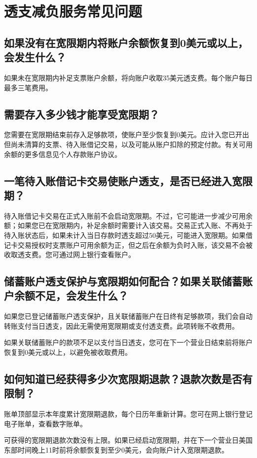 \documentclass[UTF8,fontset=none,11pt,a4paper]{ctexart}
\begin{document}
\section*{透支减负服务常见问题}
\subsection*{如果没有在宽限期内将账户余额恢复到0美元或以上，会发生什么？}
如果未在宽限期内补足支票账户余额，将向账户收取35美元透支费。每个账户每日最多三笔费用。


\subsection*{需要存入多少钱才能享受宽限期？}
您需要在宽限期结束前存入足够款项，使账户至少恢复到0美元。应计入您已开出但尚未清算的支票、待入账借记交易，以及可能从账户扣除的预定付款。有关可用余额的更多信息见个人存款账户协议。


\subsection*{一笔待入账借记卡交易使账户透支，是否已经进入宽限期？}
待入账借记卡交易在正式入账前不会启动宽限期。不过，它可能进一步减少可用余额；如果您已在宽限期内，补足余额时需要计入该交易。交易正式入账、不再处于待入账状态后，如果未计入当日存款时透支超过50美元，可能进入宽限期。如果借记卡交易授权时支票账户可用余额为正，但之后在余额为负时入账，该交易不会被收取透支费。您可通过网上银行查看账户。


\subsection*{储蓄账户透支保护与宽限期如何配合？如果关联储蓄账户余额不足，会发生什么？}
如果您已登记储蓄账户透支保护，且关联储蓄账户在日终有足够款项，我们会自动转账支付当日透支，因此无需使用宽限期或支付透支费。此项转账不收费用。


如果关联储蓄账户的款项不足以支付当日透支，您可在下一个营业日结束前将账户恢复到0美元或以上，以避免被收取费用。


\subsection*{如何知道已经获得多少次宽限期退款？退款次数是否有限制？}
账单顶部显示本年度累计宽限期退款，每个日历年重新计算。您可在网上银行登记电子账单，查看数字账单。


可获得的宽限期退款次数没有上限。如果已经启动宽限期，并在下一个营业日美国东部时间晚上11时前将余额恢复到至少0美元，会向账户计入宽限期退款。
\end{document}
